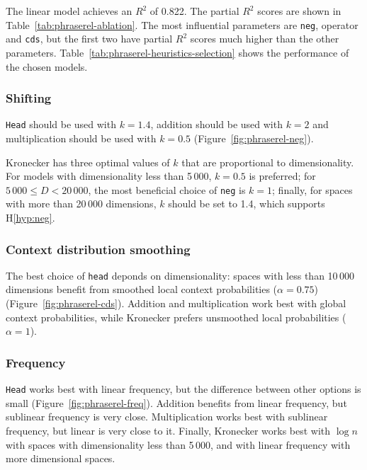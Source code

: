 The linear model achieves an $R^2$ of 0.822. The partial $R^2$ scores are shown in Table~\ref{tab:phraserel-ablation}. The most influential parameters are \texttt{neg}, operator and \texttt{cds}, but the first two have partial $R^2$ scores much higher than the other parameters. Table~\ref{tab:phraserel-heuristics-selection} shows the performance of the chosen models.

\subsubsection{Shifting}
\label{sec:shifting-phraserel}



\texttt{Head} should be used with $k = 1.4$, addition should be used with $k = 2$ and multiplication should be used with $k = 0.5$ (Figure~\ref{fig:phraserel-neg}).

Kronecker has three optimal values of $k$ that are proportional to dimensionality. For models with dimensionality less than 5\,000, $k = 0.5$ is preferred; for $5\,000 \leq D < 20\,000$, the most beneficial choice of \texttt{neg} is $k = 1$; finally, for spaces with more than 20\,000 dimensions, $k$ should be set to 1.4, which supports H\ref{hyp:neg}.

\subsubsection{Context distribution smoothing}
\label{sec:cont-distr-smooth-phraserel}

The best choice of \texttt{head} deponds on dimensionality: spaces with less than 10\,000 dimensions benefit from smoothed local context probabilities ($\alpha = 0.75$) (Figure~\ref{fig:phraserel-cds}). Addition and multiplication work best with global context probabilities, while Kronecker prefers unsmoothed local probabilities ($\alpha = 1$).

\subsubsection{Frequency}
\label{sec:frequency-phraserel}

\texttt{Head} works best with linear frequency, but the difference between other options is small (Figure~\ref{fig:phraserel-freq}). Addition benefits from linear frequency, but sublinear frequency is very close. Multiplication works best with sublinear frequency, but linear is very close to it. Finally, Kronecker works best with $\log n$ with spaces with dimensionality less than 5\,000, and with linear frequency with more dimensional spaces.

